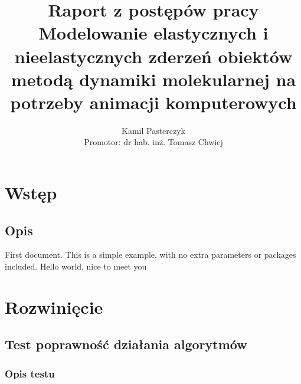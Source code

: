 \documentclass[12pt, letterpaper]{report}
\title{
    Raport z postępów pracy \\
    \large Modelowanie elastycznych i nieelastycznych
    zderzeń obiektów\\
    metodą dynamiki molekularnej na potrzeby animacji
    komputerowych
}
\author{
    Kamil Pasterczyk \\
    \small Promotor: dr hab. inż. Tomasz Chwiej
}
\begin{document}
\maketitle
\tableofcontents

\chapter{Wstęp}
    \section{Opis}
    First document. This is a simple example, with no
    extra parameters or packages included. Hello world, nice to meet you

\chapter{Rozwinięcie}
    \section{Test poprawność działania algorytmów}
    \subsection{Opis testu}
    
\end{document}

